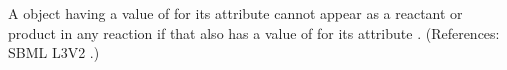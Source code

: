 A \Species object having a value of  for its attribute
 cannot appear as a reactant or product in any
reaction if that \Species also has a value of  for its attribute
.  (References: SBML L3V2
.)
